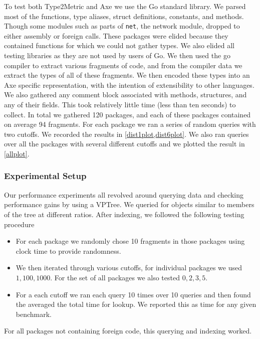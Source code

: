 To test both Type2Metric and Axe we use the Go standard library.
We parsed most of the functions, type aliases, struct definitions, constants, and methods.
Though some modules such as parts of \texttt{net}, the network module,
dropped to either assembly or foreign calls.
These packages were elided because they contained functions for which we could not gather types.
We also elided all testing libraries as they are not used by users of Go.
We then used the go compiler to extract various fragments of code,
and from the compiler data we extract the types of all of these fragments.
We then encoded these types into an Axe specific representation,
with the intention of extensibility to other languages.
We also gathered any comment block associated with methods, structures, and any of their fields.
This took relatively little time (less than ten seconds) to collect.
In total we gathered 120 packages, 
and each of these packages contained on average 94 fragments.
For each package we ran a series of random queries with two cutoffs.
We recorded the results in \ref{dist1plot,dist6plot}.
We also ran queries over all the packages with several different cutoffs
and we plotted the result in \ref{allplot}.

\subsubsection{Experimental Setup}
Our performance 
experiments all revolved around querying data and checking performance gains
by using a VPTree.
We queried for objects similar to members of the tree at different ratios.
After indexing, we followed the following testing procedure
\begin{itemize}
    \item 
    For each package we randomly chose 10 fragments in those packages 
    using clock time to provide randomness.
    \item 
    We then iterated through various cutoffs, for individual packages we 
    used $1, 100, 1000$. 
    For the set of all packages we also tested $0,2,3,5$.
    \item 
    For a each cutoff we ran each query 10 times over 10 queries 
    and then found the averaged the total time for lookup.
    We reported this as time for any given benchmark.
\end{itemize}
For all packages not containing foreign code,
this querying and indexing worked.